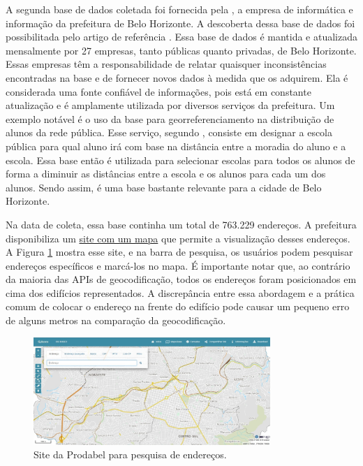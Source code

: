 A segunda base de dados coletada foi fornecida pela \cite{Prodabel}, a empresa de informática e informação da prefeitura de Belo Horizonte. A descoberta dessa base de dados foi possibilitada pelo artigo de referência \cite{Clodoveu2011}. Essa base de dados é mantida e atualizada mensalmente por 27 empresas, tanto públicas quanto privadas, de Belo Horizonte. Essas empresas têm a responsabilidade de relatar quaisquer inconsistências encontradas na base e de fornecer novos dados à medida que os adquirem. Ela é considerada uma fonte confiável de informações, pois está em constante atualização e é amplamente utilizada por diversos serviços da prefeitura. Um exemplo notável é o uso da base para georreferenciamento na distribuição de alunos da rede pública. Esse serviço, segundo \cite{Clodoveu2011}, consiste em designar a escola pública para qual aluno irá com base na distância entre a moradia do aluno e a escola. Essa base então é utilizada para selecionar escolas para todos os alunos de forma a diminuir as distâncias entre a escola e os alunos para cada um dos alunos. Sendo assim, é uma base bastante relevante para a cidade de Belo Horizonte.

Na data de coleta, essa base continha um total de 763.229 endereços. A prefeitura disponibiliza um \href{https://bhmap.pbh.gov.br}{site com um mapa} que permite a visualização desses endereços. A Figura \ref{fig:siteProdabel} mostra esse site, e na barra de pesquisa, os usuários podem pesquisar endereços específicos e marcá-los no mapa. É importante notar que, ao contrário da maioria das APIs de geocodificação, todos os endereços foram posicionados em cima dos edifícios representados. A discrepância entre essa abordagem e a prática comum de colocar o endereço na frente do edifício pode causar um pequeno erro de alguns metros na comparação da geocodificação.

\begin{figure}
    \centering
    \includegraphics[width=0.8\textwidth]{Figuras/siteProdabel.jpeg}
    \caption{Site da Prodabel para pesquisa de endereços. }
    \label{fig:siteProdabel}
\end{figure}

